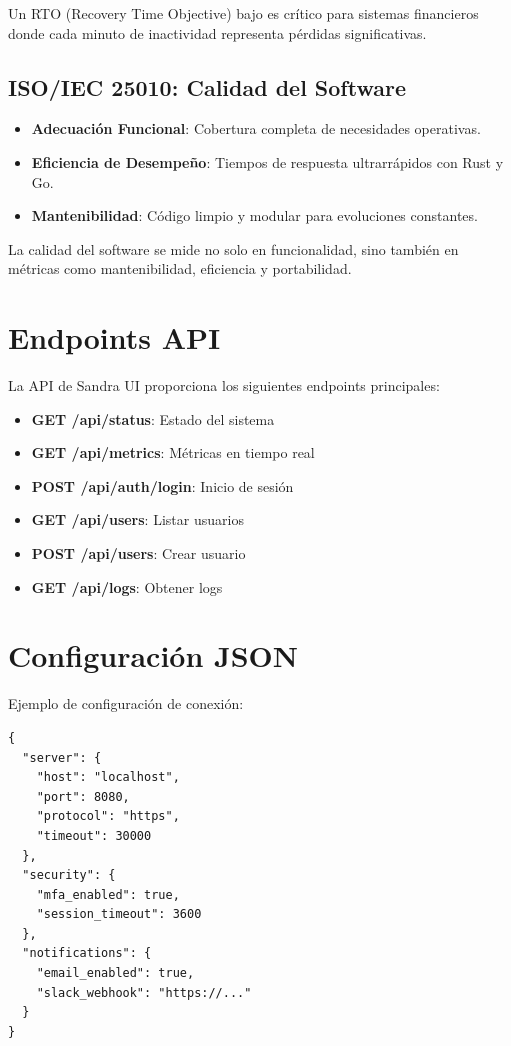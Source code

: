 Un RTO (Recovery Time Objective) bajo es crítico para sistemas financieros donde cada minuto de inactividad representa pérdidas significativas.

\subsection{ISO/IEC 25010: Calidad del Software}

\begin{itemize}
\item \textbf{Adecuación Funcional}: Cobertura completa de necesidades operativas.
\item \textbf{Eficiencia de Desempeño}: Tiempos de respuesta ultrarrápidos con Rust y Go.
\item \textbf{Mantenibilidad}: Código limpio y modular para evoluciones constantes.
\end{itemize}

La calidad del software se mide no solo en funcionalidad, sino también en métricas como mantenibilidad, eficiencia y portabilidad.

\section{Endpoints API}

La API de Sandra UI proporciona los siguientes endpoints principales:

\begin{itemize}
    \item \textbf{GET /api/status}: Estado del sistema
    \item \textbf{GET /api/metrics}: Métricas en tiempo real
    \item \textbf{POST /api/auth/login}: Inicio de sesión
    \item \textbf{GET /api/users}: Listar usuarios
    \item \textbf{POST /api/users}: Crear usuario
    \item \textbf{GET /api/logs}: Obtener logs
\end{itemize}

\section{Configuración JSON}

Ejemplo de configuración de conexión:

\begin{verbatim}
{
  "server": {
    "host": "localhost",
    "port": 8080,
    "protocol": "https",
    "timeout": 30000
  },
  "security": {
    "mfa_enabled": true,
    "session_timeout": 3600
  },
  "notifications": {
    "email_enabled": true,
    "slack_webhook": "https://..."
  }
}
\end{verbatim}

\clearpage
